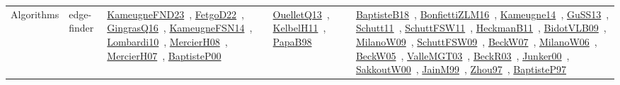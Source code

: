 {\begin{longtable}{lp{3cm}>{\raggedright\arraybackslash}p{6cm}>{\raggedright\arraybackslash}p{6cm}>{\raggedright\arraybackslash}p{8cm}}
Algorithms & edge-finder & \href{../works/KameugneFND23.pdf}{KameugneFND23}~\cite{KameugneFND23}, \href{../works/FetgoD22.pdf}{FetgoD22}~\cite{FetgoD22}, \href{../works/GingrasQ16.pdf}{GingrasQ16}~\cite{GingrasQ16}, \href{../works/KameugneFSN14.pdf}{KameugneFSN14}~\cite{KameugneFSN14}, \href{../works/Lombardi10.pdf}{Lombardi10}~\cite{Lombardi10}, \href{../works/MercierH08.pdf}{MercierH08}~\cite{MercierH08}, \href{../works/MercierH07.pdf}{MercierH07}~\cite{MercierH07}, \href{../works/BaptisteP00.pdf}{BaptisteP00}~\cite{BaptisteP00} & \href{../works/OuelletQ13.pdf}{OuelletQ13}~\cite{OuelletQ13}, \href{../works/KelbelH11.pdf}{KelbelH11}~\cite{KelbelH11}, \href{../works/PapaB98.pdf}{PapaB98}~\cite{PapaB98} & \href{../works/BaptisteB18.pdf}{BaptisteB18}~\cite{BaptisteB18}, \href{../works/BonfiettiZLM16.pdf}{BonfiettiZLM16}~\cite{BonfiettiZLM16}, \href{../works/Kameugne14.pdf}{Kameugne14}~\cite{Kameugne14}, \href{../works/GuSS13.pdf}{GuSS13}~\cite{GuSS13}, \href{../works/Schutt11.pdf}{Schutt11}~\cite{Schutt11}, \href{../works/SchuttFSW11.pdf}{SchuttFSW11}~\cite{SchuttFSW11}, \href{../works/HeckmanB11.pdf}{HeckmanB11}~\cite{HeckmanB11}, \href{../works/BidotVLB09.pdf}{BidotVLB09}~\cite{BidotVLB09}, \href{../works/MilanoW09.pdf}{MilanoW09}~\cite{MilanoW09}, \href{../works/SchuttFSW09.pdf}{SchuttFSW09}~\cite{SchuttFSW09}, \href{../works/BeckW07.pdf}{BeckW07}~\cite{BeckW07}, \href{../works/MilanoW06.pdf}{MilanoW06}~\cite{MilanoW06}, \href{../works/BeckW05.pdf}{BeckW05}~\cite{BeckW05}, \href{../works/ValleMGT03.pdf}{ValleMGT03}~\cite{ValleMGT03}, \href{../works/BeckR03.pdf}{BeckR03}~\cite{BeckR03}, \href{../works/Junker00.pdf}{Junker00}~\cite{Junker00}, \href{../works/SakkoutW00.pdf}{SakkoutW00}~\cite{SakkoutW00}, \href{../works/JainM99.pdf}{JainM99}~\cite{JainM99}, \href{../works/Zhou97.pdf}{Zhou97}~\cite{Zhou97}, \href{../works/BaptisteP97.pdf}{BaptisteP97}~\cite{BaptisteP97}\\

\end{longtable}}
